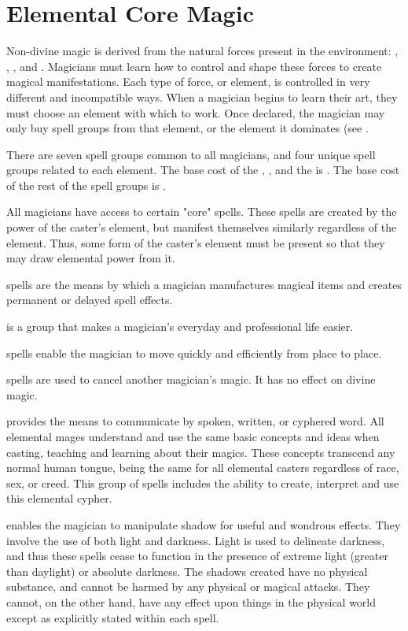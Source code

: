 \chapter{Elemental Core Magic}
\label{ch:elemental-core-magic}
Non-divine magic is derived from the natural forces present in the environment: , , , and . Magicians must learn how to control and shape these forces to create magical manifestations. Each type of force, or element, is controlled in very different and incompatible ways. When a magician begins to learn their art, they must choose an element with which to work. Once declared, the magician may only buy spell groups from that element, or the element it dominates (see .

There are seven spell groups common to all magicians, and four unique spell groups related to each element. The base cost of the , ,  and the  is . The base cost of the rest of the spell groups is .

All magicians have access to certain "core" spells. These spells are created by the power of the caster's element, but manifest themselves similarly regardless of the element. Thus, some form of the caster's element must be present so that they may draw elemental power from it.


 spells are the means by which a magician manufactures magical items and creates permanent or delayed spell effects.

 is a group that makes a magician's everyday and professional life easier.

 spells enable the magician to move quickly and efficiently from place to place.

 spells are used to cancel another magician's magic. It has no effect on divine magic.

 provides the means to communicate by spoken, written, or cyphered word. All elemental mages understand and use the same basic concepts and ideas when casting, teaching and learning about their magics. These concepts transcend any normal human tongue, being the same for all elemental casters regardless of race, sex, or creed. This group of spells includes the ability to create, interpret and use
this elemental cypher.

 enables the magician to manipulate shadow for useful and wondrous effects. They involve the use of both light and darkness. Light is used to delineate darkness, and thus these spells cease to function in the presence of extreme
light (greater than daylight) or absolute darkness. The shadows created have no physical substance, and cannot be harmed by any physical or magical attacks. They cannot, on the other hand, have any effect upon things in the physical world except as explicitly stated within each spell.

